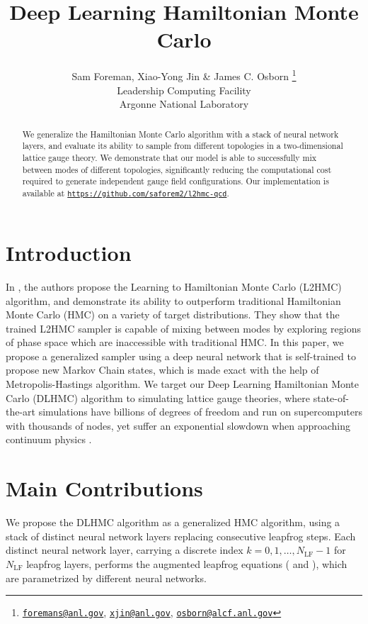 \documentclass{article} %
\title{Deep Learning Hamiltonian Monte Carlo}
\author{Sam Foreman, Xiao-Yong Jin \& James C. Osborn
\thanks{
   \texttt{\href{mailto:foremans@anl.gov}{foremans@anl.gov}},
   \texttt{\href{mailto:xjin@anl.gov}{xjin@anl.gov}},
   \texttt{\href{mailto:osborn@alcf.anl.gov}{osborn@alcf.anl.gov}}
}\\
   Leadership Computing Facility\\
   Argonne National Laboratory\\
}
\begin{document}
\maketitle
\begin{abstract}
   We generalize the Hamiltonian Monte Carlo algorithm with a stack of neural network layers,
   and evaluate its ability to sample from
   different topologies in a two-dimensional lattice gauge theory.
   We demonstrate that our model is able to successfully mix between modes of different topologies,
   significantly reducing the computational cost required to generate independent gauge field configurations.
   Our implementation is available at
   \texttt{\href{https://github.com/saforem2/lh2mc-qcd}{https://github.com/saforem2/l2hmc-qcd}}.
\end{abstract}

\section{\label{sec:introduction}Introduction}
In \citet{levy2017}, the authors propose the Learning to Hamiltonian Monte Carlo (L2HMC) algorithm, and demonstrate
its ability to outperform traditional Hamiltonian Monte Carlo (HMC) on a variety of %
target
distributions.
%
They show that the trained L2HMC sampler is capable of mixing between modes by exploring regions of phase space which are %
inaccessible with traditional HMC.\@
%
In this paper, we propose a generalized sampler using a deep neural network that is
self-trained to propose new Markov Chain states,
which is made exact with the help of Metropolis-Hastings \citep{zbMATH03349185} algorithm.
We target our Deep Learning Hamiltonian Monte Carlo (DLHMC) algorithm to simulating lattice gauge theories,
where state-of-the-art simulations have billions of degrees of freedom and run on supercomputers with thousands of nodes,
yet suffer an exponential slowdown when approaching continuum physics \citep{schaefer2009investigating,cossu2018testing}.

\section{\label{sec:maincontributions}Main Contributions}
We propose the DLHMC algorithm as a generalized HMC algorithm, using a stack of distinct neural network layers replacing
consecutive leapfrog steps.
%
Each distinct neural network layer, carrying a discrete index \(k = 0, 1, \ldots, N_{\mathrm{LF}}-1\) for
$N_{\mathrm{LF}}$ leapfrog layers, performs the augmented leapfrog equations ( and
), which are parametrized by different neural networks.
%
\end{document}
